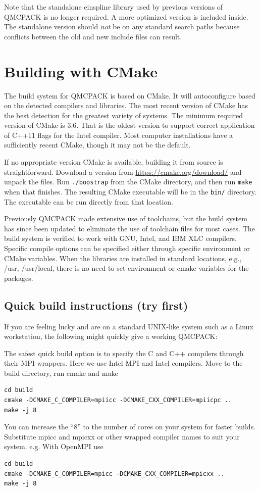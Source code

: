 Note that the standalone einspline library used by previous versions of QMCPACK
is no longer required. A more optimized version is included
inside. The standalone version should \emph{not} be on any standard
search paths because conflicts between the old and new include files
can result.

\section{Building with CMake}
\label{sec:cmake}
The build system for QMCPACK is based on CMake.  It will autoconfigure
based on the detected compilers and libraries. The most recent
version of CMake has the best detection for the greatest variety of
systems.  The minimum required version of CMake is 3.6.  That is the
oldest version to support correct application of C++11 flags for the Intel compiler.
Most computer installations have a sufficiently recent CMake, though it may not be
the default.

If no appropriate version CMake is available, building it from source is straightforward.
Download a version from \url{https://cmake.org/download/} and unpack the files.
Run \texttt{./boostrap} from the CMake directory, and then run \texttt{make}
when that finishes.  The resulting CMake executable will be in the \texttt{bin/} directory.
The executable can be run directly from that location.

Previously QMCPACK made extensive use of toolchains, but the build system
has since been updated to eliminate the use of toolchain files for
most cases.  The build system is verified to work with GNU, Intel, and IBM XLC
compilers.  Specific compile options can be specified either through
specific environment or CMake variables.  When the libraries are
installed in standard locations, e.g., /usr, /usr/local, there is no
need to set environment or cmake variables for the packages.

\subsection{Quick build instructions (try first)}
\label{sec:cmakequick}

If you are feeling lucky and are on a standard UNIX-like system such
as a Linux workstation, the following might quickly give a
working QMCPACK:

The safest quick build option is to specify the C and C++ compilers
through their MPI wrappers. Here we use Intel MPI and Intel
compilers. Move to the build directory, run cmake and make
\verbatimfont{\footnotesize}
\begin{verbatim}
cd build
cmake -DCMAKE_C_COMPILER=mpiicc -DCMAKE_CXX_COMPILER=mpiicpc ..
make -j 8
\end{verbatim}
You can increase the ``8'' to the number of cores on your system for
faster builds. Substitute mpicc and mpicxx or other wrapped compiler names to suit
  your system. e.g. With OpenMPI use
\verbatimfont{\footnotesize}
\begin{verbatim}
cd build
cmake -DCMAKE_C_COMPILER=mpicc -DCMAKE_CXX_COMPILER=mpicxx ..
make -j 8
\end{verbatim}

